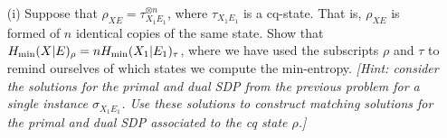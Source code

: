 \documentclass[12pt]{article}
\begin{document}
\begin{enumerate}
\begin{enumerate}
\item[(i)] Suppose that $\rho_{XE} = \tau_{X_1E_1}^{\otimes n}$, where $\tau_{X_1E_1}$ is a cq-state. That is, $\rho_{XE}$ is formed of $n$ identical copies of the same state. Show that $H_{\rm min}(X|E)_\rho = n H_{\rm min}(X_1|E_1)_\tau$, where we have used the subscripts $\rho$ and $\tau$ to remind ourselves
of which states we compute the min-entropy. \emph{[Hint: consider the solutions for the primal and dual SDP from the previous problem for a single instance $\sigma_{X_1E_1}$. Use these solutions to construct matching solutions for the primal and dual SDP associated to the cq state $\rho$.]}
\end{enumerate}

\end{enumerate}
\end{document}
